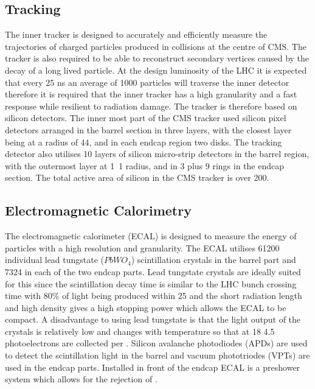 \subsection{Tracking}
The inner tracker is designed to accurately and efficiently measure the
trajectories of charged particles produced 
in collisions at the centre of CMS.
The tracker is also required to be able to reconstruct secondary vertices
caused by the decay of a long lived particle.
At the design luminosity of the LHC it is expected that every 25 ns an average
of 1000 particles will traverse the 
inner detector therefore it is required that the inner tracker has a high
granularity and a fast response while 
resilient to radiation damage. 
The tracker is therefore based on silicon detectors.
The inner most part of the CMS tracker used silicon pixel detectors arranged in
the barrel section in three layers, 
with the closest layer being at a radius of \unit{44}{\milli\meter}, and in
each endcap region two disks.
The tracking detector also utilises 10 layers of silicon micro-strip detectors
in the barrel region, 
with the outermost layer at \unit{1.1}{\meter} radius, and in 3 plus 9 rings in
the endcap section.
The total active area of silicon in the CMS tracker is over
\unit{200}{\meter\squared}.\cite{cms}

\subsection{Electromagnetic Calorimetry}
The electromagnetic calorimeter (ECAL) is designed to measure the energy of
particles with a high resolution and granularity.
The ECAL utilises 61200 individual lead tungstate ($PbWO_{4}$) scintillation
crystals in the barrel part and 7324 
in each of the two endcap parts. 
Lead tungstate crystals are ideally suited for this since the scintillation
decay time is similar to the LHC 
bunch crossing time with \unit{80}{\%} of light being produced within
\unit{25}{\nano\second} and the short 
radiation length and high density gives a high stopping power which allows the
ECAL to be compact.
A disadvantage to using lead tungstate is that the light output of the crystals
is relatively low and changes 
with temperature so that at \unit{18}{\celsius} 4.5 photoelectrons are
collected per \MeV.
Silicon avalanche photodiodes (APDs) are used to detect the scintillation light
in the barrel and vacuum 
phototriodes (VPTs) are used in the endcap parts.
Installed in front of the endcap ECAL is a preshower system which allows for
the rejection of \Ppizero .\cite{cms}

